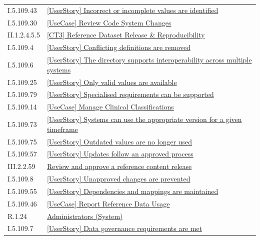 \begin{longtable}{p{.22\linewidth}p{.73\linewidth}}
I.5.109.43 & \hyperref[element:a2f83669ebfd4d508adc7ac11cf58989]{[UserStory] Incorrect or incomplete values are identified} \\
I.5.109.30 & \hyperref[element:aaa979e9fb3041dabcee7471b7ca77df]{[UseCase] Review Code System Changes} \\
II.1.2.4.5.5 & \hyperref[element:b01212ce058843b2bfee85a6d3062525]{[CT3] Reference Dataset Release \& Reproducibility} \\
I.5.109.4 & \hyperref[element:b07f7ecf57d243eab213bb90420f8ad0]{[UserStory] Conflicting definitions are removed} \\
I.5.109.6 & \hyperref[element:b1622ff87ec9479ea060df3f8bb562fe]{[UserStory] The directory supports interoperability across multiple systems} \\
I.5.109.25 & \hyperref[element:babebba011404d5b8a07b1aa9d384b2f]{[UserStory] Only valid values are available} \\
I.5.109.79 & \hyperref[element:c0bbbe51fc994e1c839eff193ba7c64b]{[UserStory] Specialised requirements can be supported} \\
I.5.109.14 & \hyperref[element:c4d6f71a72ac48b29ce77f6f853293b8]{[UseCase] Manage Clinical Classifications} \\
I.5.109.73 & \hyperref[element:c9c391827414475f8033066099fa4da3]{[UserStory] Systems can use the appropriate version for a given timeframe} \\
I.5.109.75 & \hyperref[element:ca667857ab4b4e01b64ff90e094d434f]{[UserStory] Outdated values are no longer used} \\
I.5.109.57 & \hyperref[element:cc23a9525bbe4a3ebf486addff1523e8]{[UserStory] Updates follow an approved process} \\
III.2.2.59 & \hyperref[element:cdca249dbbef4d798219d4732bd8e74f]{Review and approve a reference content release} \\
I.5.109.8 & \hyperref[element:ce2a48cea81f4ec49cb1c25ba1e1fa11]{[UserStory] Unapproved changes are prevented} \\
I.5.109.55 & \hyperref[element:ceff957b2095450b8cbaabf4d8162cce]{[UserStory] Dependencies and mappings are maintained} \\
I.5.109.46 & \hyperref[element:d9eb297d3417405abcc468e2a0667337]{[UseCase] Report Reference Data Usage} \\
R.1.24 & \hyperref[element:ddeedc03593c4d658f6aa053d13767c5]{Administrators (System)} \\
I.5.109.7 & \hyperref[element:de1748cef6ff475b8db07330f11cc299]{[UserStory] Data governance requirements are met} \\

\end{longtable}

